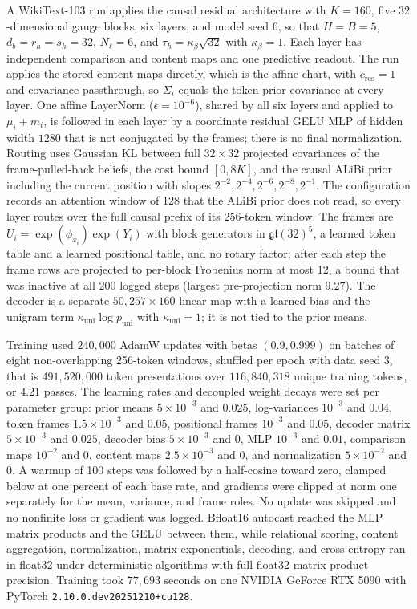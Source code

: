 \documentclass[twoside,11pt]{article}
\begin{document}
A WikiText-103 \citep{merity2017pointer} run applies the causal residual architecture with $K=160$, five $32$-dimensional gauge blocks, six layers, and model seed 6, so that $H=B=5$, $d_b=r_h=s_h=32$, $N_\ell=6$, and $\tau_h=\kappa_\beta\sqrt{32}$ with $\kappa_\beta=1$. Each layer has independent comparison and content maps and one predictive readout. The run applies the stored content maps directly, which is the affine chart, with $c_{\mathrm{res}}=1$ and covariance passthrough, so $\Sigma_i$ equals the token prior covariance at every layer. One affine LayerNorm ($\epsilon=10^{-6}$), shared by all six layers and applied to $\mu_i+m_i$, is followed in each layer by a coordinate residual GELU MLP of hidden width $1280$ that is not conjugated by the frames; there is no final normalization. Routing uses Gaussian KL between full $32\times32$ projected covariances of the frame-pulled-back beliefs, the cost bound $[0,8K]$, and the causal ALiBi prior including the current position with slopes $2^{-2},2^{-4},2^{-6},2^{-8},2^{-1}$. The configuration records an attention window of 128 that the ALiBi prior does not read, so every layer routes over the full causal prefix of its 256-token window. The frames are $U_i=\exp(\phi_{x_i})\exp(Y_i)$ with block generators in $\mathfrak{gl}(32)^{5}$, a learned token table and a learned positional table, and no rotary factor; after each step the frame rows are projected to per-block Frobenius norm at most 12, a bound that was inactive at all 200 logged steps (largest pre-projection norm $9.27$). The decoder is a separate $50{,}257\times160$ linear map with a learned bias and the unigram term $\kappa_{\mathrm{uni}}\log p_{\mathrm{uni}}$ with $\kappa_{\mathrm{uni}}=1$; it is not tied to the prior means.

Training used $240{,}000$ AdamW updates with betas $(0.9,0.999)$ on batches of eight non-overlapping 256-token windows, shuffled per epoch with data seed 3, that is $491{,}520{,}000$ token presentations over $116{,}840{,}318$ unique training tokens, or $4.21$ passes. The learning rates and decoupled weight decays were set per parameter group: prior means $5\times10^{-3}$ and $0.025$, log-variances $10^{-3}$ and $0.04$, token frames $1.5\times10^{-3}$ and $0.05$, positional frames $10^{-3}$ and $0.05$, decoder matrix $5\times10^{-3}$ and $0.025$, decoder bias $5\times10^{-3}$ and $0$, MLP $10^{-3}$ and $0.01$, comparison maps $10^{-2}$ and $0$, content maps $2.5\times10^{-3}$ and $0$, and normalization $5\times10^{-2}$ and $0$. A warmup of 100 steps was followed by a half-cosine toward zero, clamped below at one percent of each base rate, and gradients were clipped at norm one separately for the mean, variance, and frame roles. No update was skipped and no nonfinite loss or gradient was logged. Bfloat16 autocast reached the MLP matrix products and the GELU between them, while relational scoring, content aggregation, normalization, matrix exponentials, decoding, and cross-entropy ran in float32 under deterministic algorithms with full float32 matrix-product precision. Training took $77{,}693$ seconds on one NVIDIA GeForce RTX 5090 with PyTorch \texttt{2.10.0.dev20251210+cu128}.
\end{document}
